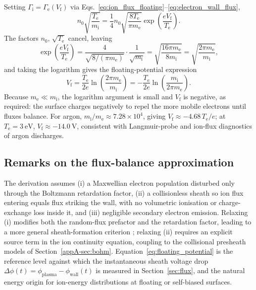 Setting $\Gamma_{\mathrm{i}} = \Gamma_{\mathrm{e}}(V_{\mathrm{f}})$ via Eqs.~\eqref{eq:ion_flux_floating}--\eqref{eq:electron_wall_flux},
\begin{equation}
n_{0}\sqrt{\frac{T_{\mathrm{e}}}{m_{\mathrm{i}}}} = \frac{1}{4}n_{0}\sqrt{\frac{8T_{\mathrm{e}}}{\pi m_{\mathrm{e}}}}\exp\!\left(\frac{eV_{\mathrm{f}}}{T_{\mathrm{e}}}\right).
\end{equation}
The factors $n_{0}$, $\sqrt{T_{\mathrm{e}}}$ cancel, leaving
\begin{equation}
\exp\!\left(\frac{eV_{\mathrm{f}}}{T_{\mathrm{e}}}\right) = \frac{4}{\sqrt{8/(\pi m_{\mathrm{e}})}}\cdot\frac{1}{\sqrt{m_{\mathrm{i}}}}
= \sqrt{\frac{16\pi m_{\mathrm{e}}}{8 m_{\mathrm{i}}}}
= \sqrt{\frac{2\pi m_{\mathrm{e}}}{m_{\mathrm{i}}}},
\end{equation}
and taking the logarithm gives the floating-potential expression
\begin{equation}
\boxed{V_{\mathrm{f}} = \frac{T_{\mathrm{e}}}{2e}\ln\!\left(\frac{2\pi m_{\mathrm{e}}}{m_{\mathrm{i}}}\right) = -\frac{T_{\mathrm{e}}}{2e}\ln\!\left(\frac{m_{\mathrm{i}}}{2\pi m_{\mathrm{e}}}\right)}.
\label{eq:floating_potential}
\end{equation}
Because $m_{\mathrm{e}} \ll m_{\mathrm{i}}$, the logarithm argument is small and $V_{\mathrm{f}}$ is negative, as required: the surface charges negatively to repel the more mobile electrons until fluxes balance. For argon, $m_{\mathrm{i}}/m_{\mathrm{e}} \approx 7.28\times10^{4}$, giving $V_{\mathrm{f}} \approx -4.68\,T_{\mathrm{e}}/e$; at $T_{\mathrm{e}} = \SI{3}{\electronvolt}$, $V_{\mathrm{f}} \approx \SI{-14.0}{\volt}$, consistent with Langmuir-probe and ion-flux diagnostics of argon discharges.

\subsection{Remarks on the flux-balance approximation}

The derivation assumes (i) a Maxwellian electron population disturbed only through the Boltzmann retardation factor, (ii) a collisionless sheath so ion flux entering equals flux striking the wall, with no volumetric ionisation or charge-exchange loss inside it, and (iii) negligible secondary electron emission. Relaxing (i) modifies both the random-flux prefactor and the retardation factor, leading to a more general sheath-formation criterion \cite{ref0090}; relaxing (ii) requires an explicit source term in the ion continuity equation, coupling to the collisional presheath models of Section~\ref{appA-sec:bohm}. Equation~\eqref{eq:floating_potential} is the reference level against which the instantaneous sheath voltage drop $\Delta\phi(t) = \phi_{\mathrm{plasma}} - \phi_{\mathrm{wall}}(t)$ is measured in Section~\ref{sec:flux}, and the natural energy origin for ion-energy distributions at floating or self-biased surfaces.

